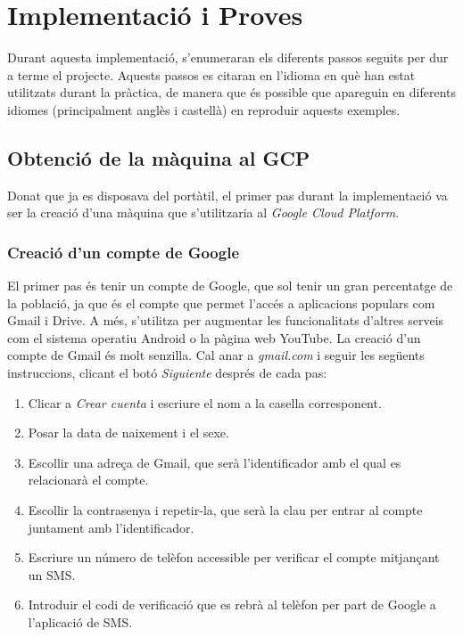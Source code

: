 \chapter{Implementació i Proves}
\label{cap:11}

Durant aquesta implementació, s'enumeraran els diferents passos seguits per dur a terme el projecte. Aquests passos es citaran en l'idioma en què han estat utilitzats durant la pràctica, de manera que és possible que apareguin en diferents idiomes (principalment anglès i castellà) en reproduir aquests exemples.

\section{Obtenció de la màquina al GCP}

Donat que ja es disposava del portàtil, el primer pas durant la implementació va ser la creació d'una màquina que s'utilitzaria al \textit{Google Cloud Platform}.

\subsection{Creació d'un compte de Google}

El primer pas és tenir un compte de Google, que sol tenir un gran percentatge de la població, ja que és el compte que permet l'accés a aplicacions populars com Gmail i Drive. A més, s'utilitza per augmentar les funcionalitats d'altres serveis com el sistema operatiu Android o la pàgina web YouTube. La creació d'un compte de Gmail és molt senzilla. Cal anar a \textit{gmail.com} i seguir les següents instruccions, clicant el botó \textit{Siguiente} després de cada pas: \begin{enumerate} \item Clicar a \textit{Crear cuenta} i escriure el nom a la casella corresponent. \item Posar la data de naixement i el sexe. \item Escollir una adreça de Gmail, que serà l'identificador amb el qual es relacionarà el compte. \item Escollir la contrasenya i repetir-la, que serà la clau per entrar al compte juntament amb l'identificador. \item Escriure un número de telèfon accessible per verificar el compte mitjançant un SMS. \item Introduir el codi de verificació que es rebrà al telèfon per part de Google a l'aplicació de SMS. \end{enumerate}


